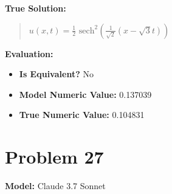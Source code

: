 \documentclass{article}
\begin{document}
\textbf{True Solution:}
\begin{quote}
$u(x,t) = \frac{1}{2} \text{ sech}^2(\frac{1}{\sqrt{2}} (x - \sqrt{3}t))$
\end{quote}

\textbf{Evaluation:}
\begin{itemize}
\item \textbf{Is Equivalent?} No
\item \textbf{Model Numeric Value:} 0.137039
\item \textbf{True Numeric Value:} 0.104831
\end{itemize}
\vspace{1cm}
\section*{Problem 27}
\textbf{Model:} Claude 3.7 Sonnet
\end{document}
